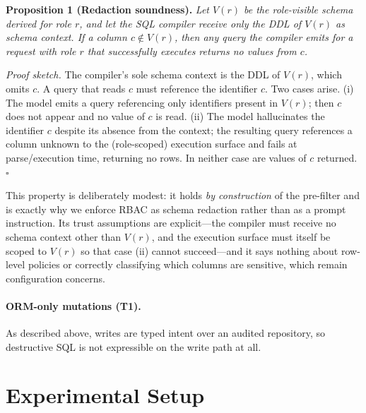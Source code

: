 \documentclass[runningheads]{llncs}
\begin{document}
\smallskip\noindent\textbf{Proposition 1 (Redaction soundness).} \emph{Let $V(r)$ be the role-visible schema derived for role $r$, and let the SQL compiler receive only the DDL of $V(r)$ as schema context. If a column $c \notin V(r)$, then any query the compiler emits for a request with role $r$ that successfully executes returns no values from $c$.}

\smallskip\noindent\emph{Proof sketch.} The compiler's sole schema context is the DDL of $V(r)$, which omits $c$. A query that reads $c$ must reference the identifier $c$. Two cases arise. (i) The model emits a query referencing only identifiers present in $V(r)$; then $c$ does not appear and no value of $c$ is read. (ii) The model hallucinates the identifier $c$ despite its absence from the context; the resulting query references a column unknown to the (role-scoped) execution surface and fails at parse/execution time, returning no rows. In neither case are values of $c$ returned. $\square$

\smallskip This property is deliberately modest: it holds \emph{by construction} of the pre-filter and is exactly why we enforce RBAC as schema redaction rather than as a prompt instruction. Its trust assumptions are explicit---the compiler must receive no schema context other than $V(r)$, and the execution surface must itself be scoped to $V(r)$ so that case (ii) cannot succeed---and it says nothing about row-level policies or correctly classifying which columns are sensitive, which remain configuration concerns.

\paragraph{ORM-only mutations (T1).} As described above, writes are typed intent over an audited repository, so destructive SQL is not expressible on the write path at all.

\section{Experimental Setup}
\label{sec:setup}
\end{document}
